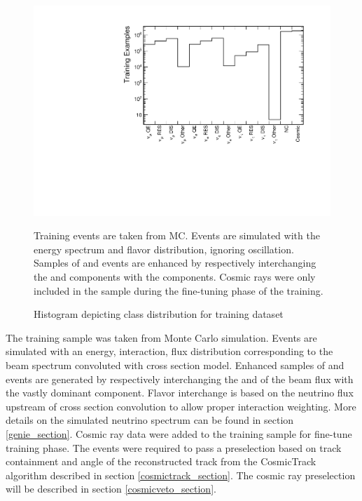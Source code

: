 \begin{figure}
\begin{center}
\includegraphics[width=\textwidth]{figures/cnn/traindist.pdf}
\end{center}
\caption{Histogram depicting class distribution for training dataset}{
  Training events are taken from \nova MC.  Events are simulated with the
  \numi energy spectrum and flavor distribution, ignoring oscillation.
  Samples of \nue and \nutau events are enhanced by respectively interchanging the \nue and \nutau components with the \numu components.
  Cosmic rays were only included in the sample during the fine-tuning phase of
  the training.
}
\label{traindist}
\end{figure}

The training sample was taken from \nova Monte Carlo simulation.
Events are simulated with an energy, interaction, flux distribution
corresponding to the \numi beam spectrum convoluted with \genie
cross section model.  Enhanced samples of \nue and \nutau
events are generated by respectively interchanging the \nue and \nutau
of the \numi beam flux with the vastly dominant \numu component.
Flavor interchange is based on the neutrino flux
upstream of \genie cross section convolution to allow proper interaction
weighting.
More details on the simulated neutrino spectrum can be found in section
\ref{genie_section}.
Cosmic ray data were added to the training sample for fine-tune training phase.
The events were required to pass a preselection based on track
containment and angle of the reconstructed track from the CosmicTrack algorithm
described in section \ref{cosmictrack_section}.
The cosmic ray preselection will be described in section
\ref{cosmicveto_section}.



